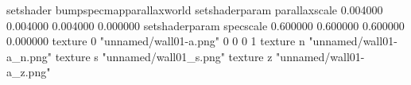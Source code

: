 setshader bumpspecmapparallaxworld
setshaderparam parallaxscale 0.004000 0.004000 0.004000 0.000000
setshaderparam specscale 0.600000 0.600000 0.600000 0.000000
texture 0 "unnamed/wall01-a.png" 0 0 0 1
texture n "unnamed/wall01-a_n.png"
texture s "unnamed/wall01_s.png"
texture z "unnamed/wall01-a_z.png"